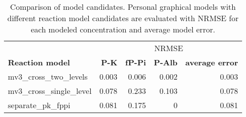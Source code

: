 \documentclass[border=1mm, preview]{standalone}
\begin{document}
\begin{table}[H]

\caption{Comparison of model candidates. Personal graphical models with different reaction model candidates are evaluated with NRMSE for each modeled concentration and average model error.}
\centering
\begin{tabular}[t]{lrrrr}
\toprule
\multicolumn{1}{c}{ } & \multicolumn{4}{c}{NRMSE} \\
\cmidrule(l{3pt}r{3pt}){2-5}
\textbf{Reaction model} & \textbf{P-K} & \textbf{fP-Pi} & \textbf{P-Alb} & \textbf{average error}\\
\midrule
mv3\_cross\_two\_levels & 0.003 & 0.006 & 0.002 & 0.003\\
mv3\_cross\_single\_level & 0.078 & 0.233 & 0.103 & 0.078\\
separate\_pk\_fppi & 0.081 & 0.175 & 0 & 0.081\\
\bottomrule
\end{tabular}
\end{table}
\end{document}
